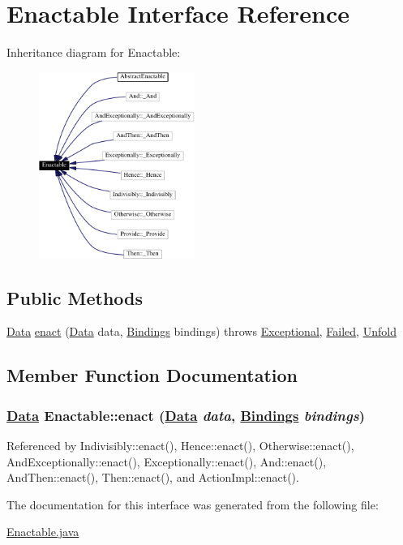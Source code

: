 \hypertarget{interfaceEnactable}{
\section{Enactable  Interface Reference}
\label{interfaceEnactable}
}
Inheritance diagram for Enactable:\begin{figure}[H]
\begin{center}
\leavevmode
\includegraphics[width=144pt]{interfaceEnactable__inherit__graph}
\end{center}
\end{figure}
\subsection*{Public Methods}
\begin{CompactItemize}
\item 
\hyperlink{interfaceData}{Data} \hyperlink{interfaceEnactable_a0}{enact} (\hyperlink{interfaceData}{Data} data, \hyperlink{interfaceBindings}{Bindings} bindings) throws \hyperlink{classExceptional}{Exceptional}, \hyperlink{classFailed}{Failed}, \hyperlink{classUnfold}{Unfold}
\end{CompactItemize}


\subsection{Member Function Documentation}
\hypertarget{interfaceEnactable_a0}{
\subsubsection[enact]{\setlength{\rightskip}{0pt plus 5cm}\hyperlink{interfaceData}{Data} Enactable::enact (\hyperlink{interfaceData}{Data} {\em data}, \hyperlink{interfaceBindings}{Bindings} {\em bindings})}}
\label{interfaceEnactable_a0}




Referenced by Indivisibly::enact(), Hence::enact(), Otherwise::enact(), And\-Exceptionally::enact(), Exceptionally::enact(), And::enact(), And\-Then::enact(), Then::enact(), and Action\-Impl::enact().



The documentation for this interface was generated from the following file:\begin{CompactItemize}
\item 
\hyperlink{Enactable_8java-source}{Enactable.java}\end{CompactItemize}
